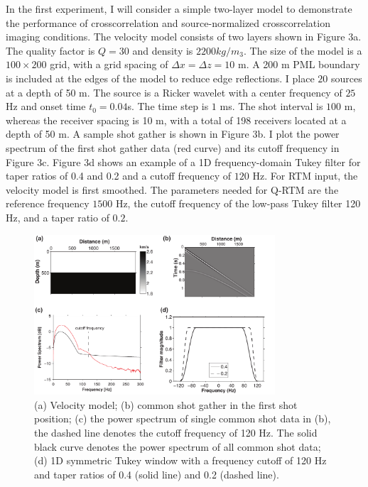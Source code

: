 In the first experiment, I will consider a simple two-layer model to demonstrate the performance of crosscorrelation and source-normalized crosscorrelation imaging conditions. The velocity model consists of two layers shown in Figure 3a. The quality factor is $Q=30$ and density is $2200 kg/m_3$. The size of the model is a $100\times 200$  grid, with a grid spacing of $\Delta x=\Delta z=10$ m. A 200 m PML boundary is included at the edges of the model to reduce edge reflections. I place $20$ sources at a depth of 50 m. The source is a Ricker wavelet with a center frequency of $25$ Hz and onset time  $ t_0=0.04 $s. The time step is $1$ ms. The shot interval is $100$ m, whereas the receiver spacing is 10 m, with a total of 198 receivers located at a depth of 50 m. A sample shot gather is shown in Figure 3b. I plot the power spectrum of the first shot gather data (red curve) and its cutoff frequency in Figure 3c. Figure 3d shows an example of a 1D frequency-domain Tukey filter for taper ratios of 0.4 and 0.2 and a cutoff frequency of $120$ Hz. For RTM input, the velocity model is first smoothed. The parameters needed for Q-RTM are the reference frequency $1500$ Hz, the cutoff frequency of the low-pass Tukey filter 120 Hz, and a taper ratio of $0.2$.

 \begin{figure}[!htb]
   \centering
   \includegraphics[width=0.8\textwidth]{Fig/fig3-eps-converted-to}
   \caption{(a) Velocity model; (b) common shot gather in the first shot position; (c) the power spectrum of single common shot data in (b), the dashed line denotes the cutoff frequency of 120 Hz. The solid black curve denotes the power spectrum of all common shot data; (d) 1D symmetric Tukey window with a frequency cutoff of 120 Hz and taper ratios of 0.4 (solid line) and 0.2 (dashed line).}
 \end{figure}

